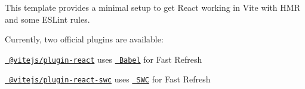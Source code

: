 This template provides a minimal setup to get React working in Vite with HMR and some ESLint rules.

Currently, two official plugins are available\+:


\begin{DoxyItemize}
\item \href{https://github.com/vitejs/vite-plugin-react/blob/main/packages/plugin-react/README.md}{\texttt{ @vitejs/plugin-\/react}} uses \href{https://babeljs.io/}{\texttt{ Babel}} for Fast Refresh
\item \href{https://github.com/vitejs/vite-plugin-react-swc}{\texttt{ @vitejs/plugin-\/react-\/swc}} uses \href{https://swc.rs/}{\texttt{ SWC}} for Fast Refresh 
\end{DoxyItemize}